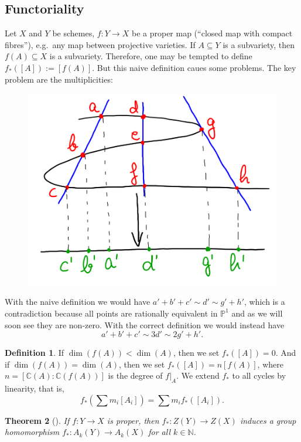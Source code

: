 \documentclass[12pt,a4paper]{amsart}
\theoremstyle{plain}
\newtheorem{thm}{Theorem}
\theoremstyle{definition}
\newtheorem{defn}[thm]{Definition}
\theoremstyle{remark}
\begin{document}
\subsection{Functoriality \cite[\S 1.2.6]{eh16}}

Let $X$ and $Y$ be schemes, $f\colon Y\to X$ be a proper map (``closed map with compact fibres''), e.g.~any map between projective varieties.
If $A\subseteq Y$ is a subvariety, then $f(A)\subseteq X$ is a subvariety.
Therefore, one may be tempted to define $f_{*}([A]):=[f(A)]$.
But this naive definition caues some problems.
The key problem are the multiplicities:
\begin{figure}[H]
    \centering
    \includegraphics[scale=.9]{pictures/pushforward}
\end{figure}

With the naive definition we would have $a'+b'+c'\sim d'\sim g'+h'$, which is a contradiction because all points are rationally equivalent in $\mathbb{P}^{1}$ and as we will soon see they are non-zero.
With the correct definition we would instead have
\[ a'+b'+c'\sim 3d'\sim 2g'+h'. \]

\begin{defn}
    If $\dim(f(A))<\dim(A)$, then we set $f_{*}([A])=0$.
    And if $\dim(f(A))=\dim(A)$, then we set $f_{*}([A])=n[f(A)]$, where $n=[\mathbb{C}(A):\mathbb{C}(f(A))]$ is the degree of $f|_{A}$.
    We extend $f_{*}$ to all cycles by linearity, that is,
    \[ f_{*}(\sum m_{i}[A_{i}])=\sum m_{i}f_{*}([A_{i}]). \]
\end{defn}

\begin{thm}[{\cite[\S 1.4]{ful98}}]
    If $f\colon Y\to X$ is proper, then $f_{*}\colon Z(Y)\to Z(X)$ induces a group homomorphism $f_{*}\colon A_{k}(Y)\to A_{k}(X)$ for all $k\in \mathbb{N}$.
\end{thm}
\end{document}

